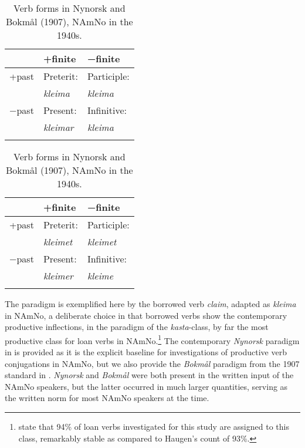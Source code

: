 \documentclass[output=paper]{langscibook}
\begin{document}
\begin{table}[h]
\begin{subtable}{.5\textwidth}
\centering
\caption{}\label{tab:eide:1a}
\begin{tabular}{lll}
\lsptoprule
& +finite & −finite\\
\midrule
+past & Preterit:        & Participle: \\
      & \textit{kleima}  & \textit{kleima}\\
−past & Present:         & Infinitive: \\
      & \textit{kleimar} & \textit{kleima}\\
\lspbottomrule
\end{tabular}
\end{subtable}%
\begin{subtable}{.5\textwidth}
\centering
\caption{}\label{tab:eide:1b}
\begin{tabular}{lll}
\lsptoprule
& +finite & −finite\\
\midrule
+past & Preterit:         & Participle: \\
      & \textit{kleimet}  & \textit{kleimet}\\
−past & Present:          & Infinitive:\\
      &  \textit{kleimer} & \textit{kleime}\\
\lspbottomrule
\end{tabular}
\end{subtable}
\caption{Verb forms in Nynorsk and Bokmål (1907), NAmNo in the 1940s.}
\label{tab:eide:1}
\end{table}

The paradigm is exemplified here by the borrowed verb \textit{claim}, adapted as \textit{kleima} in NAmNo, a deliberate choice in that borrowed verbs show the contemporary productive inflections, in the paradigm of the \textit{kasta}{}-class, by far the most productive class for loan verbs in NAmNo.\footnote{\citet[82]{EideHjelde2015Verb} state that 94\% of loan verbs investigated for this study are assigned to this class, remarkably stable as compared to Haugen’s count of 93\%.}  The contemporary \textit{Nynorsk} paradigm in  is provided as it is the explicit baseline for  investigations of productive verb conjugations in NAmNo, but we also provide the \textit{Bokmål} paradigm from the 1907 standard in . \textit{Nynorsk} and \textit{Bokmål} were both present in the written input of the NAmNo speakers, but the latter occurred in much larger quantities, serving as the written norm for most NAmNo speakers at the time. 
\end{document}
